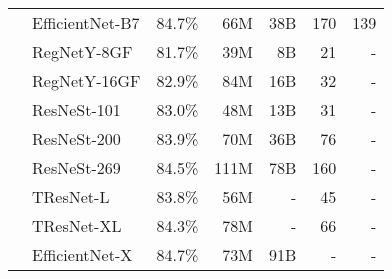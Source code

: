 \documentclass{article}
\begin{document}
\begin{table*}
{\begin{tabular}{cl||rrrrr}
          &EfficientNet-B7 \cite{efficientnet19}&   84.7\%  &     66M   &   38B   &    170    & 139 \\
&RegNetY-8GF   \cite{regnet20}        &   81.7\%  &     39M   &   8B   &     21    & -    \\
          &RegNetY-16GF   \cite{regnet20}       &   82.9\%  &     84M   &   16B   &     32    & -    \\
          &ResNeSt-101  \cite{resnest20}        &   83.0\%  &     48M   &   13B   &     31    & -    \\
          &ResNeSt-200  \cite{resnest20}        &   83.9\%  &     70M   &   36B   &     76    & -    \\
          &ResNeSt-269  \cite{resnest20}        &   84.5\%  &    111M   &   78B   &    160    & -    \\
          &TResNet-L \cite{tresnet20}  &  83.8\%   &   56M     &   -   &    45     & -  \\
          &TResNet-XL \cite{tresnet20} &  84.3\%   &   78M     &   -   &    66    & -  \\

          &EfficientNet-X \cite{efficientnetx21} &  84.7\%   &   73M     &   91B   &    -     & -  \\


\end{tabular}}
\end{table*}
\end{document}

